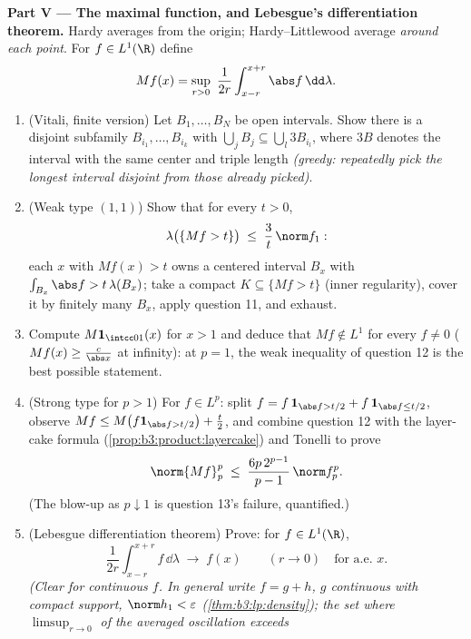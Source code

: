 \begin{problem}
\medskip
\noindent\textbf{Part V --- The maximal function, and
Lebesgue's differentiation theorem.} Hardy averages from the
origin; Hardy--Littlewood average \emph{around each point}.
For $f \in L^1(\R)$ define
\[
Mf(x) = \sup_{r>0}\ \frac1{2r}\int_{x-r}^{x+r}\abs
f\,\dd\lambda .
\]
\begin{enumerate}[resume]
  \item (Vitali, finite version) Let $B_1, \dots, B_N$ be
        open intervals. Show there is a disjoint subfamily
        $B_{i_1}, \dots, B_{i_k}$ with $\bigcup_jB_j
        \subseteq \bigcup_l3B_{i_l}$, where $3B$ denotes the
        interval with the same center and triple length
        \emph{(greedy: repeatedly pick the longest interval
        disjoint from those already picked)}.
  \item (Weak type $(1,1)$) Show that for every $t > 0$,
        \[
        \lambda\bigl(\{Mf > t\}\bigr) \;\leq\;
        \frac3t\,\norm f_1 :
        \]
        each $x$ with $Mf(x) > t$ owns a centered interval
        $B_x$ with $\int_{B_x}\abs f > t\,\lambda(B_x)$; take
        a compact $K \subseteq \{Mf > t\}$ (inner regularity),
        cover it by finitely many $B_x$, apply question 11,
        and exhaust.
  \item Compute $M\mathbf 1_{\intcc01}(x)$ for $x > 1$ and
        deduce that $Mf \notin L^1$ for every $f \neq 0$
        ($Mf(x) \geq \frac c{\abs x}$ at infinity): at $p =
        1$, the weak inequality of question 12 is the best
        possible statement.
  \item (Strong type for $p > 1$) For $f \in L^p$: split $f =
        f\,\mathbf 1_{\abs f > t/2} + f\,\mathbf 1_{\abs f
        \leq t/2}$, observe $Mf \leq M\bigl(f\mathbf 1_{\abs
        f > t/2}\bigr) + \frac t2$, and combine question 12
        with the layer-cake formula
        (\cref{prop:b3:product:layercake}) and Tonelli to
        prove
        \[
        \norm{Mf}_p^p \;\leq\;
        \frac{6p\,2^{p-1}}{p-1}\,\norm f_p^p .
        \]
        (The blow-up as $p \downarrow 1$ is question 13's
        failure, quantified.)
  \item (Lebesgue differentiation theorem) Prove: for $f \in
        L^1(\R)$,
        \[
        \frac1{2r}\int_{x-r}^{x+r}f\,\dd\lambda
        \;\longrightarrow\; f(x)
        \qquad (r \to 0)\quad\text{for a.e.\ }x .
        \]
        \emph{(Clear for continuous $f$. In general write $f
        = g + h$, $g$ continuous with compact support,
        $\norm h_1 < \varepsilon$
        (\cref{thm:b3:lp:density}); the set where
        $\limsup_{r\to0}$ of the averaged oscillation exceeds
}
\end{enumerate}
\end{problem}
